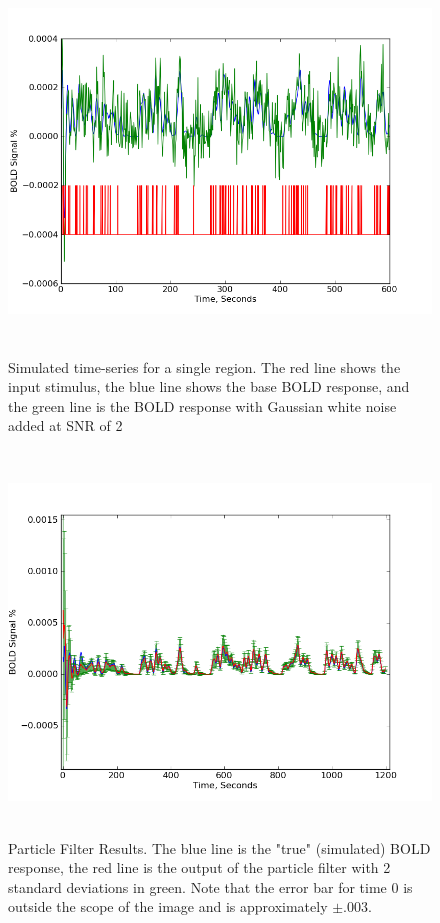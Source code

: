 \documentclass{article}
\begin{document}
\begin{figure}
\includegraphics[width=8in,height=4in]{noise.png}
\caption{Simulated time-series for a single region. The red line
shows the input stimulus, the blue line shows the base BOLD 
response, and the green line is the BOLD response with Gaussian
white noise added at SNR of 2}
\label{fig:noise}
\end{figure}

\begin{figure}
\includegraphics[width=8in,height=4in]{bold.png}
\caption{Particle Filter Results. The blue line is the "true"
(simulated) BOLD response, the red line
is the output of the particle filter with 2 standard deviations
in green. Note that the error bar for time 0 is outside the scope
of the image and is approximately $\pm .003$.}
\label{fig:bold}
\end{figure}
\end{document}
